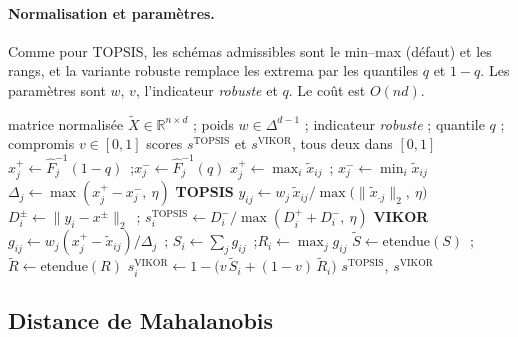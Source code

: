 \documentclass[11pt,a4paper]{article}
\theoremstyle{definition}
\theoremstyle{remark}
\newcommand{\R}{\mathbb{R}}
\newcommand{\simplex}{\Delta^{d-1}}
\begin{document}
\bigskip

\paragraph{Normalisation et paramètres.} Comme pour TOPSIS, les schémas admissibles sont le
min--max (défaut) et les rangs, et la variante robuste remplace les extrema par les
quantiles $q$ et $1-q$. Les paramètres sont $w$, $v$, l'indicateur \emph{robuste} et $q$.
Le coût est $O(nd)$.

\medskip

\begin{algorithm}[htbp]
  \caption{Scores à pôles empiriques : TOPSIS et VIKOR}
  \label{algo:poles}
  \begin{algorithmic}[1]
    \Require matrice normalisée $\tilde{X} \in \R^{n\times d}$ ; poids $w \in \simplex$ ;
      indicateur \textit{robuste} ; quantile $q$ ; compromis $v \in [0,1]$
    \Ensure scores $s^{\mathrm{TOPSIS}}$ et $s^{\mathrm{VIKOR}}$, tous deux dans $[0,1]$
      \State $x^{+}_j \gets \hat{F}_j^{-1}(1-q)$~;\quad $x^{-}_j \gets \hat{F}_j^{-1}(q)$
    \Else
      \State $x^{+}_j \gets \max_i \tilde{x}_{ij}$~;\quad
        $x^{-}_j \gets \min_i \tilde{x}_{ij}$
    \EndIf
    \State $\Delta_j \gets \max(x^{+}_j - x^{-}_j,\ \eta)$
    \Statex\hspace{-1.2em}\textbf{TOPSIS}
    \State $y_{ij} \gets w_j\,\tilde{x}_{ij} / \max\big(\|\tilde{x}_{\cdot j}\|_2,\
      \eta\big)$ 
    \State $D^{\pm}_i \gets \big\|y_i - x^{\pm}\big\|_2$~;\quad
      $s^{\mathrm{TOPSIS}}_i \gets D^{-}_i / \max(D^{+}_i + D^{-}_i,\ \eta)$
    \Statex\hspace{-1.2em}\textbf{VIKOR}
    \State $g_{ij} \gets w_j (x^{+}_j - \tilde{x}_{ij}) / \Delta_j$~;\quad
      $S_i \gets \sum_j g_{ij}$~;\quad $R_i \gets \max_j g_{ij}$
    \State $\tilde{S} \gets \mathrm{etendue}(S)$~;\quad
      $\tilde{R} \gets \mathrm{etendue}(R)$
    \State $s^{\mathrm{VIKOR}}_i \gets 1 - \big(v\,\tilde{S}_i
      + (1-v)\,\tilde{R}_i\big)$
    \State \Return $s^{\mathrm{TOPSIS}}$, $s^{\mathrm{VIKOR}}$
  \end{algorithmic}
\end{algorithm}

\bigskip

\subsection{Distance de Mahalanobis}
\label{sec:maha}
\end{document}
